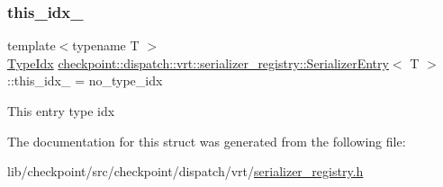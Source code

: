\subsubsection{\texorpdfstring{this\+\_\+idx\+\_\+}{this\_idx\_}}
{\footnotesize\ttfamily template$<$typename T $>$ \\
\hyperlink{namespacecheckpoint_1_1dispatch_1_1vrt_acd3f9e6b091bcfbc23dc35ea8ef45d3b}{Type\+Idx} \hyperlink{structcheckpoint_1_1dispatch_1_1vrt_1_1serializer__registry_1_1_serializer_entry}{checkpoint\+::dispatch\+::vrt\+::serializer\+\_\+registry\+::\+Serializer\+Entry}$<$ T $>$\+::this\+\_\+idx\+\_\+ = no\+\_\+type\+\_\+idx}

This entry type idx 

The documentation for this struct was generated from the following file\+:\begin{DoxyCompactItemize}
\item 
lib/checkpoint/src/checkpoint/dispatch/vrt/\hyperlink{serializer__registry_8h}{serializer\+\_\+registry.\+h}\end{DoxyCompactItemize}
